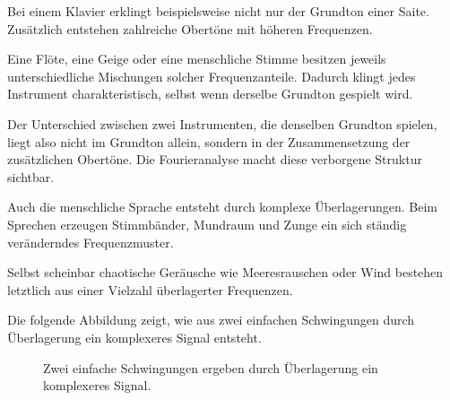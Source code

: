 Bei einem Klavier erklingt beispielsweise nicht nur der Grundton einer Saite.
Zusätzlich entstehen zahlreiche Obertöne mit höheren Frequenzen.

Eine Flöte,
eine Geige
oder eine menschliche Stimme
besitzen jeweils unterschiedliche Mischungen solcher Frequenzanteile.
Dadurch klingt jedes Instrument charakteristisch,
selbst wenn derselbe Grundton gespielt wird.

Der Unterschied zwischen zwei Instrumenten,
die denselben Grundton spielen,
liegt also nicht im Grundton allein,
sondern in der Zusammensetzung der zusätzlichen Obertöne.
Die Fourieranalyse macht diese verborgene Struktur sichtbar.

Auch die menschliche Sprache entsteht durch komplexe Überlagerungen.
Beim Sprechen erzeugen Stimmbänder,
Mundraum
und Zunge ein sich ständig veränderndes Frequenzmuster.

Selbst scheinbar chaotische Geräusche wie Meeresrauschen oder Wind
bestehen letztlich aus einer Vielzahl überlagerter Frequenzen.


Die folgende Abbildung zeigt,
wie aus zwei einfachen Schwingungen
durch Überlagerung ein komplexeres Signal entsteht.
\FloatBarrier
\begin{figure}[H]
	\centering
	\caption{Zwei einfache Schwingungen ergeben durch Überlagerung ein komplexeres Signal.}
	\label{fig:ueberlagerung}
\end{figure}

